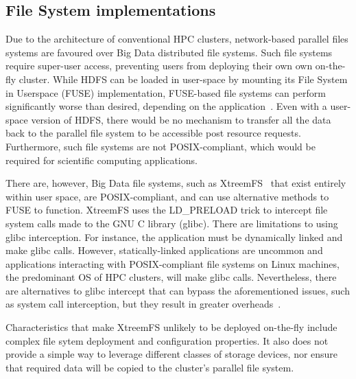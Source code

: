 \subsection{File System implementations}
      Due to the architecture of conventional HPC clusters, network-based
      parallel files systems are favoured over Big Data distributed file
      systems. Such file systems require super-user access, preventing users
      from deploying their own own on-the-fly cluster. While HDFS can be loaded
      in user-space by mounting its File System in Userspace (FUSE)
      implementation, FUSE-based file systems can perform significantly worse
      than desired, depending on the application~\cite{tofuse}. Even with a
      user-space version of HDFS, there would be no mechanism to transfer all
      the data back to the parallel file system to be accessible post resource
      requests. Furthermore, such file systems are not POSIX-compliant, which
      would be required for scientific computing applications.
      
      There are, however, Big Data file systems, such as
      XtreemFS~\cite{xtreemfs} that exist entirely within user space, are
      POSIX-compliant, and can use alternative methods to FUSE to function.
      XtreemFS uses the LD\_PRELOAD trick to intercept file system calls made to
      the GNU C library (glibc). There are limitations to using glibc
      interception. For instance, the application must be dynamically linked and
      make glibc calls. However, statically-linked applications are uncommon and
      applications interacting with POSIX-compliant file systems on Linux
      machines, the predominant OS of HPC clusters, will make glibc calls.
      Nevertheless, there are alternatives to glibc intercept that can bypass
      the aforementioned issues, such as system call interception, but they
      result in greater overheads~\cite{quinson}.

      Characteristics that make XtreemFS unlikely to be deployed on-the-fly
      include complex file sytem deployment and configuration properties. It
      also does not provide a simple way to leverage different classes of
      storage devices, nor ensure that required data will be copied to the
      cluster's parallel file system.

